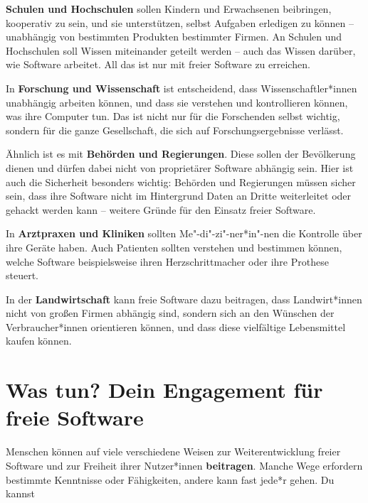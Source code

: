 \documentclass[a5paper,12pt]{scrartcl}
\begin{document}
\textbf{Schulen und Hochschulen} sollen Kindern und Erwachsenen
beibringen, kooperativ zu sein, und sie unterstützen, selbst Aufgaben
erledigen zu können -- unabhängig von bestimmten Produkten bestimmter
Firmen. An Schulen und Hochschulen soll Wissen miteinander geteilt
werden -- auch das Wissen darüber, wie Software arbeitet. All das ist
nur mit freier Software zu erreichen.

In \textbf{Forschung und Wissenschaft} ist entscheidend, dass
Wissenschaftler*innen unabhängig arbeiten können, und dass sie
verstehen und kontrollieren können, was ihre Computer tun. Das ist
nicht nur für die Forschenden selbst wichtig, sondern für die ganze
Gesellschaft, die sich auf Forschungsergebnisse verlässt.

Ähnlich ist es mit \textbf{Behörden und Regierungen}. Diese sollen der
Bevölkerung dienen und dürfen dabei nicht von proprietärer Software
abhängig sein. Hier ist auch die Sicherheit besonders wichtig:
Behörden und Regierungen müssen sicher sein, dass ihre Software nicht
im Hintergrund Daten an Dritte weiterleitet oder gehackt werden kann
-- weitere Gründe für den Einsatz freier Software.

In \textbf{Arztpraxen und Kliniken} sollten Me"-di"-zi"-ner*in"-nen
die Kontrolle über ihre Geräte haben. Auch Patienten sollten verstehen
und bestimmen können, welche Software beispielsweise ihren
Herzschrittmacher oder ihre Prothese steuert.

In der \textbf{Landwirtschaft} kann freie Software dazu beitragen,
dass Landwirt*innen nicht von großen Firmen abhängig sind, sondern
sich an den Wünschen der Verbraucher*innen orientieren können, und
dass diese vielfältige Lebensmittel kaufen können.


\section{Was tun? Dein Engagement für freie Software}

Menschen können auf viele verschiedene Weisen zur Weiterentwicklung
freier Software und zur Freiheit ihrer Nutzer*innen
\textbf{beitragen}. Manche Wege erfordern bestimmte Kenntnisse oder
Fähigkeiten, andere kann fast jede*r gehen. Du kannst
\end{document}
